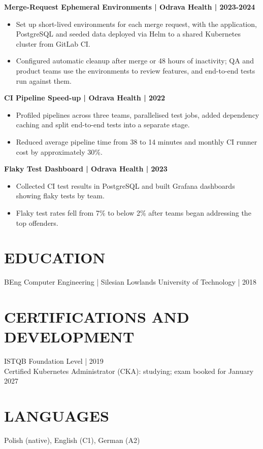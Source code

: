 \documentclass[11pt,a4paper]{article}
\begin{document}
\textbf{Merge-Request Ephemeral Environments | Odrava Health | 2023-2024}
\begin{itemize}
\item Set up short-lived environments for each merge request, with the application, PostgreSQL and seeded data deployed via Helm to a shared Kubernetes cluster from GitLab CI.
\item Configured automatic cleanup after merge or 48 hours of inactivity; QA and product teams use the environments to review features, and end-to-end tests run against them.
\end{itemize}

\textbf{CI Pipeline Speed-up | Odrava Health | 2022}
\begin{itemize}
\item Profiled pipelines across three teams, parallelised test jobs, added dependency caching and split end-to-end tests into a separate stage.
\item Reduced average pipeline time from 38 to 14 minutes and monthly CI runner cost by approximately 30\%.
\end{itemize}

\textbf{Flaky Test Dashboard | Odrava Health | 2023}
\begin{itemize}
\item Collected CI test results in PostgreSQL and built Grafana dashboards showing flaky tests by team.
\item Flaky test rates fell from 7\% to below 2\% after teams began addressing the top offenders.
\end{itemize}

\section*{EDUCATION}
BEng Computer Engineering | Silesian Lowlands University of Technology | 2018

\section*{CERTIFICATIONS AND DEVELOPMENT}
ISTQB Foundation Level | 2019\\
Certified Kubernetes Administrator (CKA): studying; exam booked for January 2027

\section*{LANGUAGES}
Polish (native), English (C1), German (A2)
\end{document}
